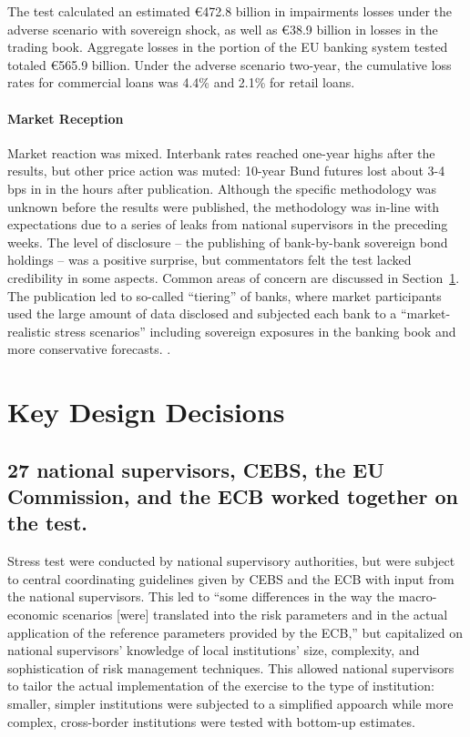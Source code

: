 \documentclass[12pt]{article}
\begin{document}
The test calculated an estimated \euro{472.8} billion in impairments losses under the adverse scenario with sovereign shock, as well as \euro{38.9} billion in losses in the trading book. Aggregate losses in the portion of the EU banking system tested totaled \euro{565.9} billion. Under the adverse scenario two-year, the cumulative loss rates for commercial loans was 4.4\%  and 2.1\% for retail loans.

\paragraph{Market Reception} Market reaction was mixed. Interbank rates reached one-year highs after the results, but other price action was muted: 10-year Bund futures lost about 3-4 bps in  in the hours after publication. Although the specific methodology was unknown before the results were published, the methodology was in-line with expectations due to a series of leaks from national supervisors in the preceding weeks. The level of disclosure -- the publishing of bank-by-bank sovereign bond holdings -- was a positive surprise, but commentators felt the test lacked credibility in some aspects. Common areas of concern are discussed in Section~\ref{keydesign}. The publication led to so-called ``tiering'' of banks, where market participants used the large amount of data disclosed and subjected each bank to a ``market-realistic stress scenarios'' including sovereign exposures in the banking book and more conservative forecasts. \citep{Nedialkov}.

\section{Key Design Decisions}\label{keydesign}

\subsection{27 national supervisors, CEBS, the EU Commission, and the ECB worked together on the test.}

Stress test were conducted by national supervisory authorities, but were subject to central coordinating guidelines given by CEBS and the ECB with input from the national supervisors. This led to ``some differences in the way the macro-economic scenarios [were] translated into the risk parameters and in the actual application of the reference parameters provided by the ECB,'' but capitalized on national supervisors' knowledge of local institutions' size, complexity, and sophistication of risk management techniques. This allowed national supervisors to tailor the actual implementation of the exercise to the type of institution: smaller, simpler institutions were subjected to a simplified appoarch while more complex, cross-border institutions were tested with bottom-up estimates.
\end{document}
